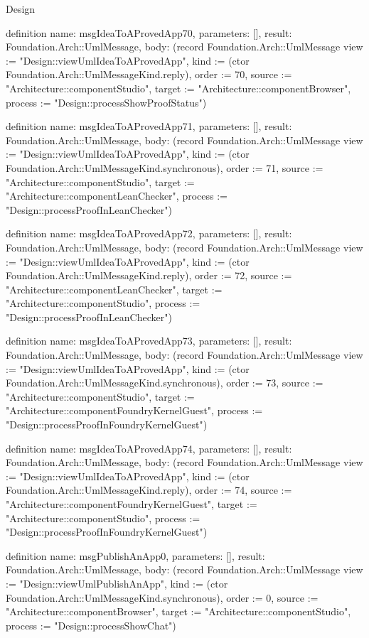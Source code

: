 \begin{lexlean}{Design}
\begin{semanticmodule}
definition{
  name: msgIdeaToAProvedApp70,
  parameters: [],
  result: Foundation.Arch::UmlMessage,
  body: (record Foundation.Arch::UmlMessage {view := "Design::viewUmlIdeaToAProvedApp", kind := (ctor Foundation.Arch::UmlMessageKind.reply), order := 70, source := "Architecture::componentStudio", target := "Architecture::componentBrowser", process := "Design::processShowProofStatus"})
}

definition{
  name: msgIdeaToAProvedApp71,
  parameters: [],
  result: Foundation.Arch::UmlMessage,
  body: (record Foundation.Arch::UmlMessage {view := "Design::viewUmlIdeaToAProvedApp", kind := (ctor Foundation.Arch::UmlMessageKind.synchronous), order := 71, source := "Architecture::componentStudio", target := "Architecture::componentLeanChecker", process := "Design::processProofInLeanChecker"})
}

definition{
  name: msgIdeaToAProvedApp72,
  parameters: [],
  result: Foundation.Arch::UmlMessage,
  body: (record Foundation.Arch::UmlMessage {view := "Design::viewUmlIdeaToAProvedApp", kind := (ctor Foundation.Arch::UmlMessageKind.reply), order := 72, source := "Architecture::componentLeanChecker", target := "Architecture::componentStudio", process := "Design::processProofInLeanChecker"})
}

definition{
  name: msgIdeaToAProvedApp73,
  parameters: [],
  result: Foundation.Arch::UmlMessage,
  body: (record Foundation.Arch::UmlMessage {view := "Design::viewUmlIdeaToAProvedApp", kind := (ctor Foundation.Arch::UmlMessageKind.synchronous), order := 73, source := "Architecture::componentStudio", target := "Architecture::componentFoundryKernelGuest", process := "Design::processProofInFoundryKernelGuest"})
}

definition{
  name: msgIdeaToAProvedApp74,
  parameters: [],
  result: Foundation.Arch::UmlMessage,
  body: (record Foundation.Arch::UmlMessage {view := "Design::viewUmlIdeaToAProvedApp", kind := (ctor Foundation.Arch::UmlMessageKind.reply), order := 74, source := "Architecture::componentFoundryKernelGuest", target := "Architecture::componentStudio", process := "Design::processProofInFoundryKernelGuest"})
}

definition{
  name: msgPublishAnApp0,
  parameters: [],
  result: Foundation.Arch::UmlMessage,
  body: (record Foundation.Arch::UmlMessage {view := "Design::viewUmlPublishAnApp", kind := (ctor Foundation.Arch::UmlMessageKind.synchronous), order := 0, source := "Architecture::componentBrowser", target := "Architecture::componentStudio", process := "Design::processShowChat"})
}


\end{semanticmodule}
\end{lexlean}
